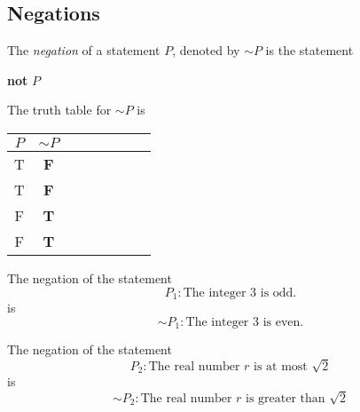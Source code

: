 \subsection{Negations}
\begin{defi}[Negation]
     The \emph{negation} of a statement $P$, denoted by $ \sim P$ is the statement
     \begin{center}
          \textbf{not} $P$
     \end{center}
\end{defi}
The truth table for $\sim P$ is 
\begin{center}
    \begin{tabular}{cccccccc}
      \toprule
      $P$ & $\sim P$  \\
      \midrule
      T & \textbf{F} \\
      T & \textbf{F} \\
      F & \textbf{T} \\
      F & \textbf{T} \\
      \bottomrule
    \end{tabular}
  \end{center}
\begin{eg}
    The negation of the statement
    \begin{equation*}
         P_1: \text{The integer $3$ is odd.}
    \end{equation*}
    is 
    \begin{equation*}
         \sim P_1:\text{The integer $3$ is even.}
    \end{equation*}
\end{eg}
\begin{eg}
     The negation of the statement          
    \begin{equation*}
          P_2:\text{The real number $r$ is at most $\sqrt{2}$} 
    \end{equation*}
    is 
    \begin{equation*}
         \sim P_2:\text{The real number $r$ is greater than $\sqrt{2}$}
    \end{equation*}
\end{eg}

